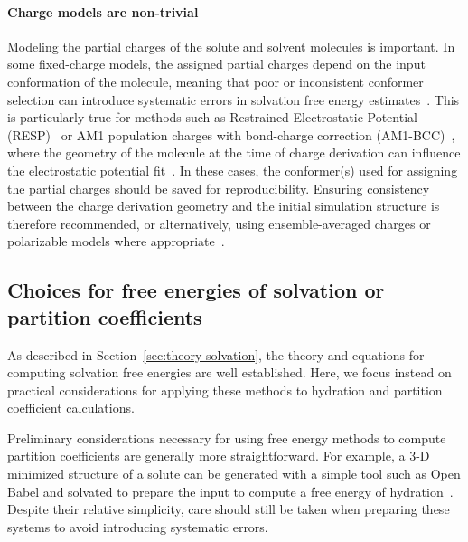 \documentclass[9pt,bestpractices]{livecoms}
\begin{document}
\paragraph{Charge models are non-trivial}
Modeling the partial charges of the solute and solvent molecules is important. In some fixed-charge models, the assigned partial charges depend on the input conformation of the molecule, meaning that poor or inconsistent conformer selection can introduce systematic errors in solvation free energy estimates~\cite{jakalian2000, jambeck2003}. This is particularly true for methods such as Restrained Electrostatic Potential (RESP)~\cite{bayly1993resp} or AM1 population charges with bond-charge correction (AM1-BCC)~\cite{jakalian2000}, where the geometry of the molecule at the time of charge derivation can influence the electrostatic potential fit~\cite{basma2001, zhang2011, dupradeau2010, osato2025}. In these cases, the conformer(s) used for assigning the partial charges should be saved for reproducibility. Ensuring consistency between the charge derivation geometry and the initial simulation structure is therefore recommended, or alternatively, using ensemble-averaged charges or polarizable models where appropriate~\cite{ren2002,lemkul2016}.


\subsection{Choices for free energies of solvation or partition coefficients}
As described in Section~\ref{sec:theory-solvation}, the theory and equations for computing solvation free energies are well established. Here, we focus instead on practical considerations for applying these methods to hydration and partition coefficient calculations.

\label{subsec:hydration}
Preliminary considerations necessary for using free energy methods to compute partition coefficients are generally more straightforward. For example, a 3-D minimized structure of a solute can be generated with a simple tool such as Open Babel and solvated to prepare the input to compute a free energy of hydration~\cite{oboyle2011open}. Despite their relative simplicity, care should still be taken when preparing these systems to avoid introducing systematic errors.
\end{document}

